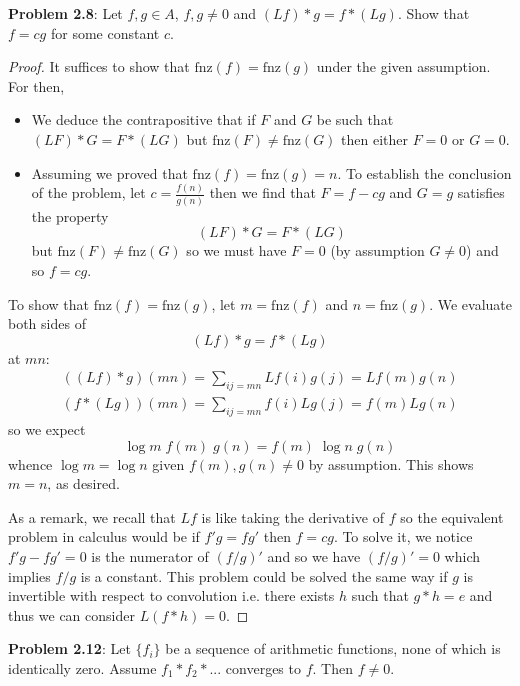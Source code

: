 \documentclass{article}
\newcommand{\fnz}{\text{fnz}}
\begin{document}
\textbf{Problem 2.8}: Let $f, g \in A$, $f, g \not= 0$ and $(Lf) * g = f * (Lg)$. Show that $f = cg$ for some constant $c$.

\begin{proof}
It suffices to show that $\fnz(f) = \fnz(g)$ under the given assumption. For then,
\begin{itemize}
\item We deduce the contrapositive that if $F$ and $G$ be such that $(LF) * G = F * (LG)$ but $\fnz(F) \not= \fnz(G)$ then either $F = 0$ or $G = 0$.
\item Assuming we proved that $\fnz(f) = \fnz(g) = n$. To establish the conclusion of the problem, let $c = \frac{f(n)}{g(n)}$ then we find that $F = f - cg$ and $G = g$ satisfies the property
$$(L F) * G = F * (L G)$$
but $\fnz(F) \not= \fnz(G)$ so we must have $F = 0$ (by assumption $G \not= 0$) and so $f = cg$.
\end{itemize}

To show that $\fnz(f) = \fnz(g)$, let $m = \fnz(f)$ and $n = \fnz(g)$. We evaluate both sides of
$$(Lf) * g = f * (Lg)$$
at $mn$:
\begin{align*}
((Lf) * g) (mn) = \sum_{ij = mn} Lf(i) g(j) = Lf(m) g(n)\\
(f * (Lg)) (mn) = \sum_{ij = mn} f(i) Lg(j) = f(m) Lg(n)
\end{align*}
so we expect
$$\log m \; f(m) \; g(n) = f(m) \; \log n \; g(n)$$
whence $\log m = \log n$ given $f(m), g(n) \not= 0$ by assumption. This shows $m = n$, as desired.

As a remark, we recall that $Lf$ is like taking the derivative of $f$ so the equivalent problem in calculus would be if $f' g = f g'$ then $f = cg$. To solve it, we notice $f' g - f g' = 0$ is the numerator of $(f/g)'$ and so we have $(f/g)' = 0$ which implies $f/g$ is a constant. This problem could be solved the same way if $g$ is invertible with respect to convolution i.e. there exists $h$ such that $g * h = e$ and thus we can consider $L(f * h) = 0$.
\end{proof}

\textbf{Problem 2.12}: Let $\{f_i\}$ be a sequence of arithmetic functions, none of which is identically zero. Assume $f_1 * f_2 * ...$ converges to $f$. Then $f \not= 0$.
\end{document}
